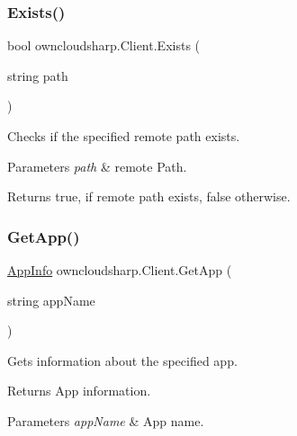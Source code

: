 \subsubsection{\texorpdfstring{Exists()}{Exists()}}
{\footnotesize\ttfamily bool owncloudsharp.\+Client.\+Exists (\begin{DoxyParamCaption}\item[{string}]{path }\end{DoxyParamCaption})}



Checks if the specified remote path exists. 


\begin{DoxyParams}{Parameters}
{\em path} & remote Path.\\
\hline
\end{DoxyParams}
\begin{DoxyReturn}{Returns}
{\ttfamily true}, if remote path exists, {\ttfamily false} otherwise.
\end{DoxyReturn}
\mbox{\label{classowncloudsharp_1_1_client_a55a02342fcec4161abe9c5798c36dabf}} 
\subsubsection{\texorpdfstring{Get\+App()}{GetApp()}}
{\footnotesize\ttfamily \hyperlink{classowncloudsharp_1_1_types_1_1_app_info}{App\+Info} owncloudsharp.\+Client.\+Get\+App (\begin{DoxyParamCaption}\item[{string}]{app\+Name }\end{DoxyParamCaption})}



Gets information about the specified app. 

\begin{DoxyReturn}{Returns}
App information.
\end{DoxyReturn}

\begin{DoxyParams}{Parameters}
{\em app\+Name} & App name.\\
\hline
\end{DoxyParams}
\mbox{\label{classowncloudsharp_1_1_client_a52851315d9d1273b6f674baafe3a5840}} 
